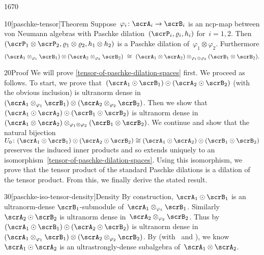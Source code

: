 \begin{parsec}{1670}%
\begin{point}{10}[paschke-tensor]{Theorem}%
Suppose~$\varphi_i \colon \scrA_i \to \scrB_i$
    is an ncp-map between von Neumann algebras
    with Paschke dilation~$(\scrP_i, \varrho_i, h_i)$
    for~$i=1,2$.
Then~$(\scrP_1 \otimes \scrP_2, \varrho_1 \otimes \varrho_2, h_1\otimes h_2)$
    is a Paschke dilation of~$\varphi_1 \otimes \varphi_2$.
    Furthermore
\begin{equation}\label{tensor-of-paschke-dilation-spaces}
(\scrA_1 \otimes_{\varphi_1} \scrB_1)
\otimes (\scrA_2 \otimes_{\varphi_2} \scrB_2)
\ \cong \ 
(\scrA_1 \otimes \scrA_2) \otimes_{\varphi_1\otimes \varphi_2} (\scrB_1 \otimes \scrB_2).
\end{equation}
\spacingfix{}
\begin{point}{20}{Proof}%
We will prove \eqref{tensor-of-paschke-dilation-spaces} first.
We proceed as follows.
To start, we prove that~$
(\scrA_1 \odot \scrB_1) \odot (\scrA_2 \odot \scrB_2)$
    (with the obvious inclusion)
    is ultranorm dense in~$(\scrA_1 \otimes_{\varphi_1} \scrB_1)
\otimes (\scrA_2 \otimes_{\varphi_2} \scrB_2)$.
Then we show that~$
(\scrA_1 \odot \scrA_2) \odot (\scrB_1 \odot \scrB_2) $
is ultranorm dense in~$
(\scrA_1 \otimes \scrA_2) \otimes_{\varphi_1\otimes \varphi_2} (\scrB_1 \otimes \scrB_2)$.
We continue and show that the natural bijection
$U_0\colon (\scrA_1 \odot \scrB_1) \odot (\scrA_2 \odot \scrB_2) \cong
(\scrA_1 \odot \scrA_2) \odot (\scrB_1 \odot \scrB_2) $
preserves the induced inner products and
    so extends uniquely to an
    isomorphism~\eqref{tensor-of-paschke-dilation-spaces}.
Using this isomorphism,
    we prove that the tensor product of the standard Paschke dilations
    is a dilation of the tensor product.
    From this, we finally derive the stated result.
\begin{point}{30}[paschke-iso-tensor-density]{Density}%
By construction, $\scrA_1 \odot \scrB_1$ is an ultranorm-dense
        $\scrB_1$-submodule
    of~$\scrA_1 \otimes_{\varphi_1} \scrB_1$.
Similarly~$\scrA_2 \odot \scrB_2 $ is ultranorm dense
    in~$\scrA_2 \otimes_{\varphi_2} \scrB_2$.
Thus by 
    $(\scrA_1 \odot \scrB_1) \odot(
    \scrA_2 \odot \scrB_2) $ is ultranorm dense in~$(\scrA_1 \otimes_{\varphi_1} \scrB_1)
\otimes (\scrA_2 \otimes_{\varphi_2} \scrB_2)$.
By 
        (with~ and ),
    we know~$\scrA_1 \odot \scrA_2$
    is an ultrastrongly-dense subalgebra
    of~$\scrA_1 \otimes \scrA_2$.

\end{point}
\end{point}
\end{point}
\end{parsec}
